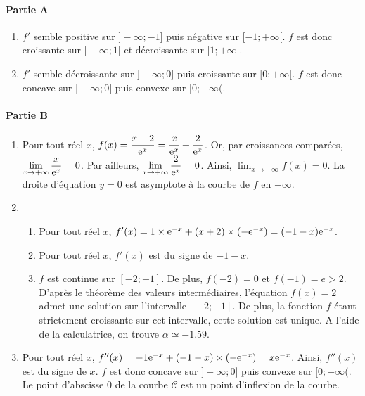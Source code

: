 \documentclass[11pt,fleqn, openany]{book} %
\begin{document}
\begin{solution}

\paragraph{Partie A}


\begin{enumerate}
\item $f'$ semble positive sur $]-\infty ;-1]$ puis négative sur $[-1;+\infty[$. $f$ est donc croissante sur $]-\infty ; 1]$ et décroissante sur $[1;+\infty[$.
\item $f'$ semble décroissante sur $]-\infty;0]$ puis croissante sur $[0;+\infty[$. $f$ est donc concave sur $]-\infty ;0]$ puis convexe sur $[0;+\infty($.
\end{enumerate}


\paragraph{Partie B}

\begin{enumerate}
\item  Pour tout réel $x$, $f(x)=\dfrac{x+2}{\mathrm{e}^x}=\dfrac{x}{\mathrm{e}^x}+\dfrac{2}{\mathrm{e}^x}$. Or, par croissances comparées, $\displaystyle\lim_{x\to +\infty}\dfrac{x}{\mathrm{e}^x}=0$. Par ailleurs,  $\displaystyle\lim_{x\to +\infty}\dfrac{2}{\mathrm{e}^x}=0$. Ainsi,  $\displaystyle\lim_{x\to +\infty}f(x)=0$. La droite d'équation $y=0$ est asymptote à la courbe de $f$ en $+\infty$.
\item \begin{enumerate}
\item Pour tout réel $x$, $f'(x)=1 \times \mathrm{e}^{-x}+(x+2) \times (-\mathrm{e}^{-x})=(-1-x)\mathrm{e}^{-x}$.
\item Pour tout réel $x$, $f'(x)$ est du signe de $-1-x$.
\begin{center}
\end{center}
\item $f$ est continue sur $[-2;-1]$. De plus, $f(-2)=0$ et $f(-1)=e>2$. D'après le théorème des valeurs intermédiaires, l'équation $f(x) = 2$ admet une solution sur l'intervalle $[-2; -1]$. De plus, la fonction $f$ étant strictement croissante sur cet intervalle, cette solution est unique. A l'aide de la calculatrice, on trouve $\alpha \simeq -1.59$.\end{enumerate}
\item Pour tout réel $x$, $f''(x)=-1\mathrm{e}^{-x}+(-1-x) \times(-\mathrm{e}^{-x})=x\mathrm{e}^{-x}$. Ainsi, $f''(x)$ est du signe de $x$. $f$ est donc concave sur $]-\infty ;0]$ puis convexe sur $[0;+\infty($. Le point d'abscisse 0 de la courbe $\mathcal{C}$ est un point d'inflexion de la courbe.\end{enumerate}

\end{solution}
\end{document}
